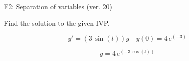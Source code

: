 \begin{exercise}
  \begin{exerciseTitle}F2: Separation of variables (ver. 20)\end{exerciseTitle}
  \begin{exerciseStatement}
    
Find the solution to the given IVP.

    
\[y'=( 3 \, \sin\left(t\right) )y\hspace{1em} y(0)= 4 \, e^{\left(-3\right)}\]

  \end{exerciseStatement}
  \begin{exerciseAnswer}
    
\[y= 4 \, e^{\left(-3 \, \cos\left(t\right)\right)}\]

  \end{exerciseAnswer}
\end{exercise}